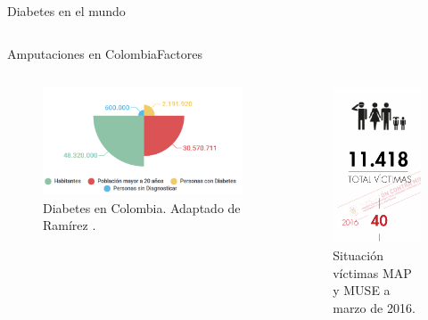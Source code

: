 \documentclass[10pt]{beamer}
\begin{document}
\begin{frame}{Diabetes en el mundo}
\begin{columns}[t]
\end{columns}

\end{frame}

\begin{frame}{Amputaciones en Colombia}{Factores}

\begin{columns}[t]


\column{70 mm}

\begin{figure}
\begin{centering}
\includegraphics[scale=0.3]{Feathergraphics/DiabetesCol}
\par\end{centering}
\caption{{\scriptsize{}Diabetes en Colombia. Adaptado de Ramírez \cite{Ramirez2014}. }}

\end{figure}


\column{40 mm}
\begin{figure}
\begin{centering}
\includegraphics[scale=0.45]{Feathergraphics/TotalvictimasPAICMA}
\caption{{\scriptsize{}Situación víctimas MAP y MUSE a marzo de 2016\cite{PAICMA}}.}
\end{centering}
\end{figure}

\end{columns}

\end{frame}
\end{document}
